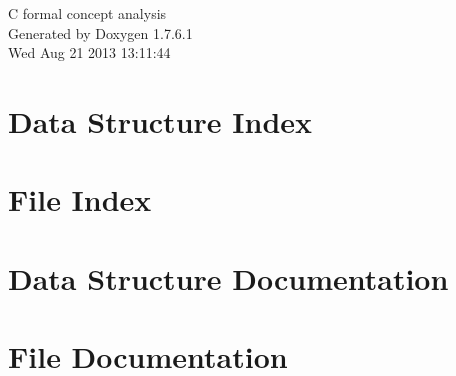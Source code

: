 \documentclass[a4paper]{book}
\begin{document}
\hypersetup{pageanchor=false,citecolor=blue}
\begin{titlepage}
\vspace*{7cm}
\begin{center}
{\Large \-C formal concept analysis }\\
\vspace*{1cm}
{\large \-Generated by Doxygen 1.7.6.1}\\
\vspace*{0.5cm}
{\small Wed Aug 21 2013 13:11:44}\\
\end{center}
\end{titlepage}
\clearemptydoublepage
{}
\tableofcontents
\clearemptydoublepage
{}
\hypersetup{pageanchor=true,citecolor=blue}
\chapter{\-Data \-Structure \-Index}

\chapter{\-File \-Index}

\chapter{\-Data \-Structure \-Documentation}









\chapter{\-File \-Documentation}








\printindex
\end{document}
